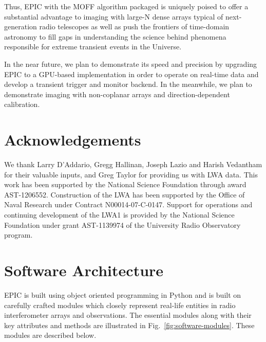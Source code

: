 \documentclass[a4paper,fleqn,usenatbib]{mnras}
\begin{document}
Thus, EPIC with the MOFF algorithm packaged is uniquely poised to offer a
substantial advantage to imaging with large-N dense arrays typical of 
next-generation radio telescopes as well as push the frontiers of 
time-domain astronomy to fill gaps in understanding the science behind 
phenomena responsible for extreme transient events in the Universe.

In the near future, we plan to demonstrate its speed and precision by upgrading EPIC to a GPU-based implementation in order to operate on real-time data and develop a transient trigger and monitor backend. In the meanwhile, we plan to demonstrate imaging with non-coplanar arrays and direction-dependent calibration. 

\section*{Acknowledgements}

We thank Larry D'Addario, Gregg Hallinan, Joseph Lazio and Harish Vedantham for 
their valuable inputs, and Greg Taylor for providing us with LWA data. This work 
has been supported by the National Science Foundation through award AST-1206552. 
Construction of the LWA has been supported by the Office of Naval Research under 
Contract N00014-07-C-0147. Support for operations and continuing development of 
the LWA1 is provided by the National Science Foundation under grant AST-1139974 
of the University Radio Observatory program.



 
%  
% 


\appendix

\section{Software Architecture}\label{sec:software-modules}

EPIC is built using object oriented programming in Python and is built on
carefully crafted modules which closely represent real-life entities in radio 
interferometer arrays and observations. The essential modules along with their
key attributes and methods are illustrated in Fig.~\ref{fig:software-modules}.
These modules are described below.
\end{document}
